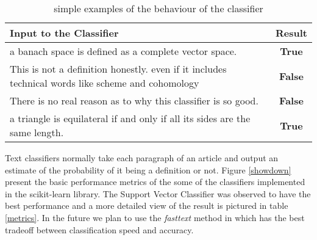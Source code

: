 \documentclass[a4paper]{easychair}
\begin{document}
\begin{table}[h]
    \begin{center}
    \begin{tabular}{|p{}|c|}
        \hline
        \hline
        \textbf{Input to the Classifier} & \textbf{Result} \\
        \hline
        \hline
        a banach space is defined as a complete vector space. & \textbf{True}\\
        \hline
        This is not a definition honestly. even if it includes technical words like scheme and cohomology & \textbf{False} \\
        \hline
        There is no real reason as to why this classifier is so good. & \textbf{False}\\
        \hline
        a triangle is equilateral if and only if all its sides are the same length. & \textbf{True}\\
        \hline
    \end{tabular}
    \caption{\label{sanity}simple examples of the behaviour of the classifier}
    \end{center} 
\end{table}

 Text classifiers normally take each paragraph of an article and output an estimate of the probability of it being a definition or not.  Figure \ref{showdown} present the basic performance metrics of the some of the classifiers implemented in the scikit-learn library. The Support Vector Classifier was observed to have the best performance and a more detailed view of the result is pictured in table \ref{metrics}. In the future we plan  to use the \textit{fasttext} method in \cite{bagof} which has the best tradeoff between classification speed and accuracy.  
\end{document}

